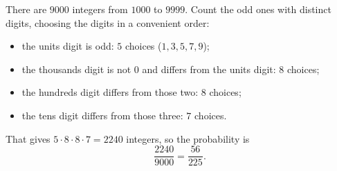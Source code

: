 There are $9000$ integers from $1000$ to $9999$. Count the odd ones with distinct digits, choosing the digits in a convenient order:
\begin{itemize}
\item the units digit is odd: $5$ choices ($1,3,5,7,9$);
\item the thousands digit is not $0$ and differs from the units digit: $8$ choices;
\item the hundreds digit differs from those two: $8$ choices;
\item the tens digit differs from those three: $7$ choices.
\end{itemize}
That gives $5\cdot8\cdot8\cdot7=2240$ integers, so the probability is
\[\dfrac{2240}{9000}=\boxed{\dfrac{56}{225}}.\]
